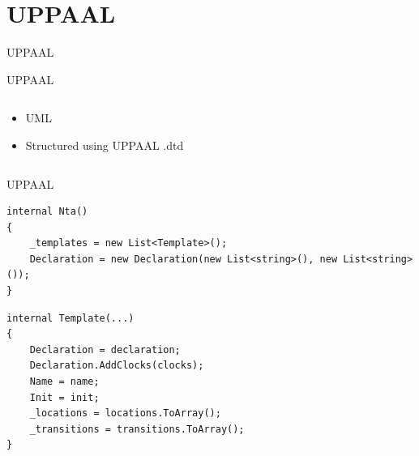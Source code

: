 \section{UPPAAL}
\begin{frame}[shrink=5]{UPPAAL}
    \begin{center}
        
    \end{center}
\end{frame}
\begin{frame}{UPPAAL}
    \begin{columns}
        \begin{column}{0.4\textwidth}
            \begin{itemize}
                \item UML
                \item Structured using UPPAAL .dtd
            \end{itemize}
        \end{column}
        \begin{column}{0.6\textwidth}
            \scalebox{0.8}{
                
            }
        \end{column}
    \end{columns}

\end{frame}
\begin{frame}[fragile]{UPPAAL}

    \begin{lstlisting}[style=csharp]
internal Nta()
{
    _templates = new List<Template>();
    Declaration = new Declaration(new List<string>(), new List<string>());
}    
    \end{lstlisting}
    \vspace{1em}
    \begin{lstlisting}[style=csharp]
internal Template(...)
{
    Declaration = declaration;
    Declaration.AddClocks(clocks);
    Name = name;
    Init = init;
    _locations = locations.ToArray();
    _transitions = transitions.ToArray();
}  
    \end{lstlisting}
\end{frame}

